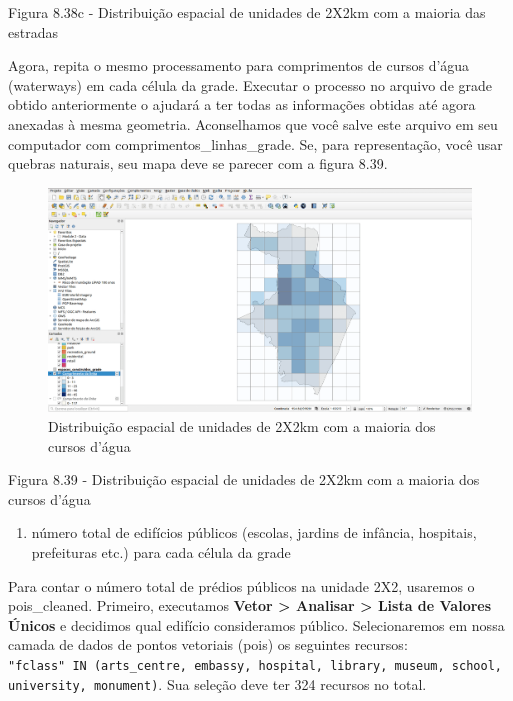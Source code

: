 \documentclass[
]{krantz}
\providecommand{\tightlist}{%
  \setlength{\itemsep}{0pt}\setlength{\parskip}{0pt}}
\begin{document}
Figura 8.38c - Distribuição espacial de unidades de 2X2km com a maioria das estradas

Agora, repita o mesmo processamento para comprimentos de cursos d'água (waterways) \hspace{0pt}\hspace{0pt}em cada célula da grade. Executar o processo no arquivo de grade obtido anteriormente o ajudará a ter todas as informações obtidas até agora anexadas à mesma geometria. Aconselhamos que você salve este arquivo em seu computador com comprimentos\_linhas\_grade. Se, para representação, você usar quebras naturais, seu mapa deve se parecer com a figura 8.39.

\begin{figure}
\centering
\includegraphics{media/modulo8/fig839.png}
\caption{Distribuição espacial de unidades de 2X2km com a maioria dos cursos d'água}
\end{figure}

Figura 8.39 - Distribuição espacial de unidades de 2X2km com a maioria dos cursos d'água

\begin{enumerate}
\def\labelenumi{\arabic{enumi}.}
\setcounter{enumi}{2}
\tightlist
\item
  número total de edifícios públicos (escolas, jardins de infância, hospitais, prefeituras etc.) para cada célula da grade
\end{enumerate}

Para contar o número total de prédios públicos na unidade 2X2, usaremos o pois\_cleaned. Primeiro, executamos \textbf{Vetor \textgreater{} Analisar \textgreater{} Lista de Valores Únicos} e decidimos qual edifício consideramos público. Selecionaremos em nossa camada de dados de pontos vetoriais (pois) os seguintes recursos: \texttt{"fclass"\ IN\ (\textquotesingle{}arts\_centre\textquotesingle{},\ \textquotesingle{}embassy\textquotesingle{},\ \textquotesingle{}hospital\textquotesingle{},\ \textquotesingle{}library\textquotesingle{},\ \textquotesingle{}museum\textquotesingle{},\ \textquotesingle{}school\textquotesingle{},\ \textquotesingle{}university\textquotesingle{},\ \textquotesingle{}monument\textquotesingle{})}. Sua seleção deve ter 324 recursos no total.
\end{document}
